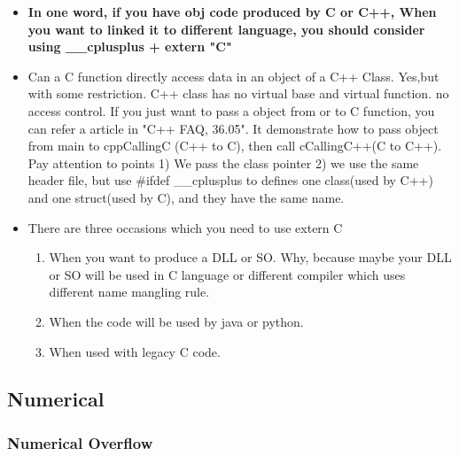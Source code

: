 \documentclass[a4paper,12pt,twoside]{book}
\begin{document}
\begin{itemize}
    \item \textbf{In one word, if you have obj code produced by C or C++, When you want to linked it to different language, you should consider using \_\_cplusplus + extern "C" }
    
    \item Can a C function directly access data in an object of a C++ Class. Yes,but with some restriction. C++ class has no virtual base and virtual function. no access control. If you just want to pass a object from or to C function, you can refer a article in "C++ FAQ, 36.05". It demonstrate how to pass object from main to cppCallingC (C++ to C), then call cCallingC++(C to C++). Pay attention to points 1) We pass the class pointer 2) we use the same header file, but use \#ifdef \_\_cplusplus to defines one class(used by C++) and one struct(used by C), and they have the same name.
    
    \item There are three occasions which you need to use extern C
    \begin{enumerate}
        \item When you want to produce a DLL or SO. Why, because maybe your DLL or SO will be used in C language or different compiler which uses different name mangling rule.
        
        \item When the code will be used by java or python.
        
        \item When used with legacy C code.
    \end{enumerate}
    
\end{itemize}


\subsection{Numerical}
\subsubsection{Numerical Overflow}
\end{document}
